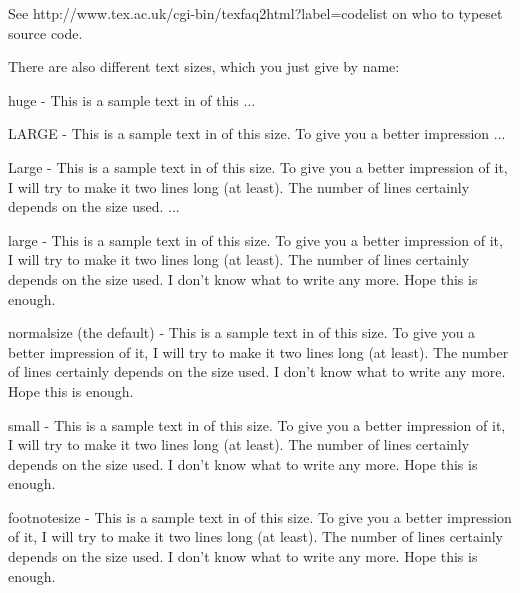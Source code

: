 See http://www.tex.ac.uk/cgi-bin/texfaq2html?label=codelist on who to typeset source code.

There are also different text sizes, which you just give by name:

\begin{huge}huge  - This is a sample text in of this ...\end{huge}

\begin{LARGE}LARGE  - This is a sample text in of this size. To give you a better impression ...\end{LARGE}

\begin{Large}Large  - This is a sample text in of this size. To give you a better impression of it, I will try to make it two lines long (at least). The number of lines certainly depends on the size used. ...\end{Large}

\begin{large}large  - This is a sample text in of this size. To give you a better impression of it, I will try to make it two lines long (at least). The number of lines certainly depends on the size used. I don't know what to write any more. Hope this is enough.\end{large}

\begin{normalsize}normalsize (the default)  - This is a sample text in of this size. To give you a better impression of it, I will try to make it two lines long (at least). The number of lines certainly depends on the size used. I don't know what to write any more. Hope this is enough.\end{normalsize}

\begin{small}small  - This is a sample text in of this size. To give you a better impression of it, I will try to make it two lines long (at least). The number of lines certainly depends on the size used. I don't know what to write any more. Hope this is enough.\end{small}

\begin{footnotesize}footnotesize  - This is a sample text in of this size. To give you a better impression of it, I will try to make it two lines long (at least). The number of lines certainly depends on the size used. I don't know what to write any more. Hope this is enough.\end{footnotesize}

